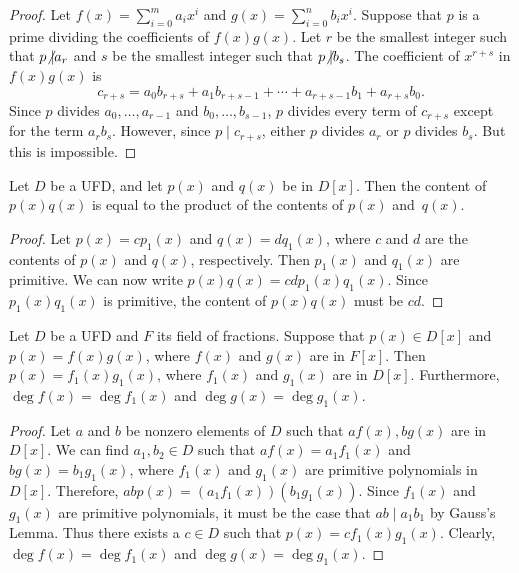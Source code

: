 \begin{proof}
Let $f(x) = \sum_{i=0}^{m} a_i x^i$ and $g(x) = \sum_{i=0}^{n} b_i x^i$.  Suppose that $p$ is a prime dividing the coefficients of $f(x)
g(x)$.  Let $r$ be the smallest integer such that $p {\not{\mid}} a_r$ and $s$ be the smallest integer such that $p {\not{\mid}} b_s$.  The
coefficient of $x^{r+s}$ in $f(x) g(x)$ is 
\[
c_{r+s} = a_0 b_{r+s} + a_1 b_{r+s-1} + \cdots + a_{r+s-1} b_1 +
a_{r+s} b_0. 
\]
Since $p$ divides $a_0, \ldots, a_{r-1}$ and $b_0, \ldots, b_{s-1}$, $p$ divides every term of $c_{r+s}$ except for the term $a_r b_s$.  However, since $p \mid c_{r+s}$, either $p$ divides $a_r$ or $p$ divides $b_s$. But this is impossible.
\end{proof}
 

\begin{lemma}
Let $D$ be a UFD, and let $p(x)$ and $q(x)$ be in $D[x]$. Then the
content of $p(x) q(x)$ is equal to the product of the contents of
$p(x)$ and~$q(x)$.
\end{lemma}

\begin{proof}
Let $p(x) = c p_1(x)$ and $q(x) = d q_1(x)$, where $c$ and $d$ are the
contents of $p(x)$ and $q(x)$, respectively.  Then $p_1(x)$ and
$q_1(x)$ are primitive. We can now write $p(x) q(x) = c d p_1(x)
q_1(x)$. Since $p_1(x) q_1(x)$ is primitive, the content of $p(x)
q(x)$ must be $cd$.
\end{proof}

\begin{lemma}\label{domains:UFD_factor_lemma}
Let $D$ be a UFD and $F$ its field of fractions. Suppose that $p(x)
\in D[x]$ and $p(x) = f(x) g(x)$, where $f(x)$ and $g(x)$ are in 
$F[x]$. Then $p(x) = f_1(x) g_1(x)$, where $f_1(x)$ and $g_1(x)$ are in
$D[x]$.  Furthermore, $\deg f(x) = \deg f_1(x)$ and $\deg g(x) = \deg
g_1(x)$. 
\end{lemma}

\begin{proof}
Let $a$ and $b$ be nonzero elements of $D$ such that $a f(x), b g(x)$
are in $D[x]$. We can find $a_1, b_2 \in D$ such that $a f(x) = a_1
f_1(x)$ and $b g(x) = b_1 g_1(x)$, where $f_1(x)$ and $g_1(x)$ are
primitive polynomials in $D[x]$. Therefore, $a b p(x) = (a_1 f_1(x))(
b_1 g_1(x))$.  Since $f_1(x)$ and $g_1(x)$ are primitive polynomials,
it must be the case that $ab \mid a_1 b_1$ by Gauss's Lemma. Thus there
exists a $c \in D$ such that $p(x) = c f_1(x) g_1(x)$. Clearly, $\deg
f(x) = \deg f_1(x)$ and $\deg g(x) = \deg g_1(x)$. 
\end{proof}

